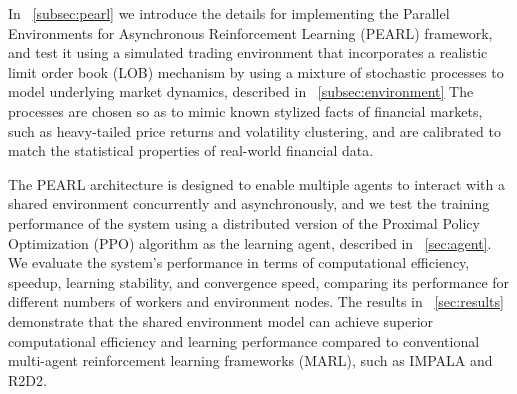 In ~\autoref{subsec:pearl} we introduce the details for implementing the Parallel Environments for Asynchronous Reinforcement Learning (PEARL) framework,
and test it using a simulated trading environment that incorporates a realistic limit order book (LOB) mechanism
by using a mixture of stochastic processes to model underlying market dynamics, described in ~\autoref{subsec:environment}
The processes are chosen so as to mimic known stylized facts of financial markets, such as heavy-tailed price returns and
volatility clustering, and are calibrated to match the statistical properties of real-world financial data.

The PEARL architecture is designed to enable multiple agents to interact with a shared environment concurrently and asynchronously,
and we test the training performance of the system using a distributed version of the Proximal Policy Optimization (PPO) algorithm
as the learning agent, described in ~\autoref{sec:agent}.
We evaluate the system's performance in terms of computational efficiency, speedup, learning stability, and convergence speed,
comparing its performance for different numbers of workers and environment nodes.
The results in ~\autoref{sec:results} demonstrate that the shared environment model can achieve superior computational efficiency and learning performance compared to
conventional multi-agent reinforcement learning frameworks (MARL), such as IMPALA and R2D2.
